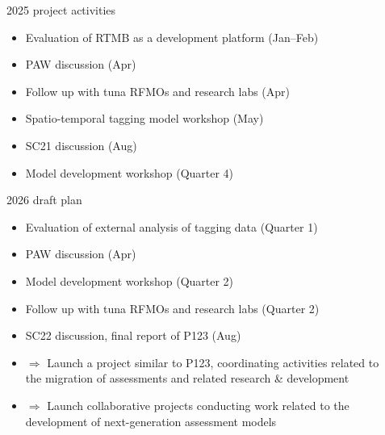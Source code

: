 \documentclass[aspectratio=169,fleqn]{beamer}
\begin{document}

\begin{frame}{2025 project activities}
  \begin{itemize}
    \item[] Evaluation of RTMB as a development platform (Jan--Feb)\\[3ex]
    \item[] PAW discussion (Apr)\\[3ex]
    \item[] Follow up with tuna RFMOs and research labs (Apr)\\[3ex]
    \item[] Spatio-temporal tagging model workshop (May)\\[3ex]
    \item[] SC21 discussion (Aug)\\[3ex]
    \item[] Model development workshop (Quarter 4)\\[2ex]
  \end{itemize}
\end{frame}


\begin{frame}{2026 draft plan}
  \begin{itemize}
    \item[] Evaluation of external analysis of tagging data (Quarter 1)\\[2ex]
    \item[] PAW discussion (Apr)\\[2ex]
    \item[] Model development workshop (Quarter 2)\\[2ex]
    \item[] Follow up with tuna RFMOs and research labs (Quarter 2)\\[2ex]
    \item[] SC22 discussion, final report of P123 (Aug)\\[2ex]
    \item[] $\Rightarrow$ Launch a project similar to P123, {\green
      coordinating} activities related to\\
    \phantom{$\Rightarrow$} the migration of assessments and related research \&
    development\\[2ex]
    \item[] $\Rightarrow$ Launch collaborative projects {\green conducting} work
    related to the\\
    \phantom{$\Rightarrow$} development of next-generation assessment models\\[2ex]
  \end{itemize}
\end{frame}
\end{document}
